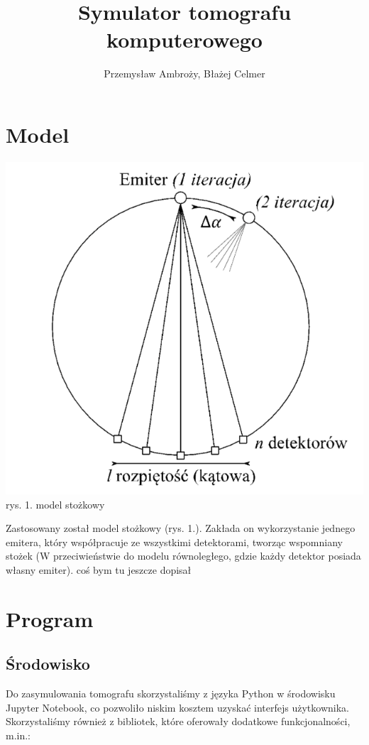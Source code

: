 \documentclass[polish,polish,a4paper]{article}
\title{Symulator tomografu komputerowego}
\author{Przemysław Ambroży, Błażej Celmer}
\begin{document}
 
	\maketitle
	
 	\section{Model}
		\begin{center}
			\includegraphics[scale=0.7]{img/model.png} \\
			\small{rys. 1. model stożkowy}
		\end{center}
		Zastosowany został model stożkowy (rys. 1.).
		 Zakłada on wykorzystanie jednego emitera,
		  który współpracuje ze wszystkimi detektorami, tworząc wspomniany stożek 
		  (W przeciwieństwie do modelu równoległego, gdzie każdy detektor posiada własny emiter).
		 {\color{red}  coś bym tu jeszcze dopisał }
		
	\section{Program}
		\subsection{Środowisko}
			Do zasymulowania tomografu skorzystaliśmy z języka Python w środowisku Jupyter Notebook,
			 co pozwoliło niskim kosztem uzyskać interfejs użytkownika.
			 Skorzystaliśmy również z bibliotek, które oferowały dodatkowe funkcjonalności, m.in.:
			
\end{document}
